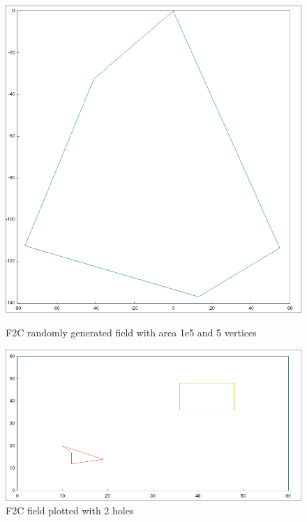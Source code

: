 \documentclass[progress]{cmpreport}
\begin{document}
\begin{appendix}
	\begin{figure}[H]
		\centering
		\begin{minipage}[b]{0.75\textwidth}
			\centering
			\includegraphics[width=\textwidth]{images/f2cMappingRandom.jpg}
			\caption{F2C randomly generated field with area 1e5 and 5 vertices}
		\end{minipage}

		\hfill
		\vspace{1em}

		\begin{minipage}[b]{0.75\textwidth}
			\centering
			\includegraphics[width=\textwidth]{images/f2cMappingHoles.jpg}
			\caption{F2C field plotted with 2 holes}
		\end{minipage}

		\hfill

	\end{figure}
\end{appendix}

% 

\end{document}

